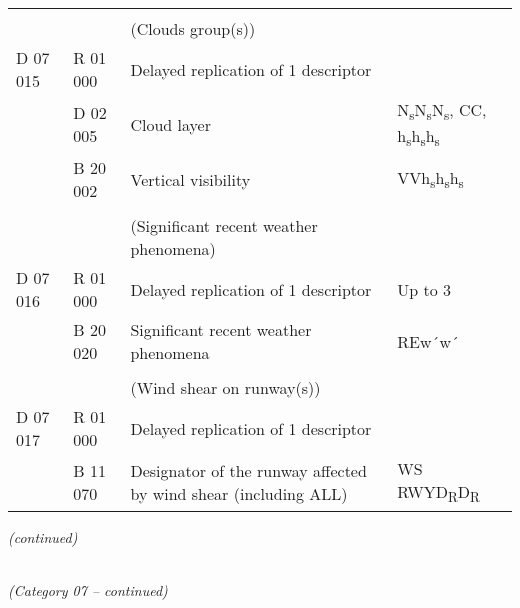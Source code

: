 \begin{longtable}[]{@{}llll@{}}
& & &\tabularnewline
& & (Clouds group(s)) &\tabularnewline
D 07 015 & R 01 000 & Delayed replication of 1 descriptor &\tabularnewline
& D 02 005 & Cloud layer & N\textsubscript{s}N\textsubscript{s}N\textsubscript{s}, CC, h\textsubscript{s}h\textsubscript{s}h\textsubscript{s}\tabularnewline
& B 20 002 & Vertical visibility & VVh\textsubscript{s}h\textsubscript{s}h\textsubscript{s}\tabularnewline
& & &\tabularnewline
& & (Significant recent weather phenomena) &\tabularnewline
D 07 016 & R 01 000 & Delayed replication of 1 descriptor & Up to 3\tabularnewline
& B 20 020 & Significant recent weather phenomena & REw´w´\tabularnewline
& & &\tabularnewline
& & (Wind shear on runway(s)) &\tabularnewline
D 07 017 & R 01 000 & Delayed replication of 1 descriptor &\tabularnewline
& B 11 070 & Designator of the runway affected by wind shear (including ALL) & WS RWYD\textsubscript{R}D\textsubscript{R}\tabularnewline
\bottomrule
\end{longtable}

\emph{(continued)}

\emph{\\
(Category 07 -- continued)}

